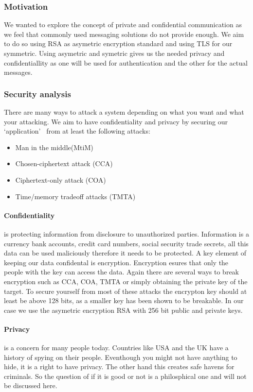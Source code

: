 
\subsubsection{Motivation}
We wanted to explore the concept of private and confidential
communication as we feel that commonly used messaging solutions do not
provide enough. We aim to do so using RSA as asymetric encryption
standard and using TLS for our symmetric. Using asymetric and symetric
gives us the needed privacy and confidentiallity as one will be used
for authentication and the other for the actual messages.


\subsubsection{Security analysis}
There are many ways to attack a system depending on what you want and
what your attacking. We aim to have confidentiality and privacy by
securing our `application'~ from at least the
following attacks:
\begin{itemize}
\item Man in the middle(MtiM)
\item Chosen-ciphertext attack (CCA)
\item Ciphertext-only attack (COA)
\item Time/memory tradeoff attacks (TMTA)
\end{itemize}

\paragraph{Confidentiality} is protecting information from disclosure
to unauthorized parties. Information is a currency bank accounts,
credit card numbers, social security trade secrets, all this data can
be used maliciously therefore it needs to be protected. A key element
of keeping our data confidental is encryption. Encryption esures that
only the people with the key can access the data. Again there are
several ways to break encryption such as CCA, COA, TMTA or simply
obtaining the private key of the target. To secure yourself from most
of these attacks the encrypton key should at least be above 128 bits,
as a smaller key has been shown to be breakable. In our case we use
the asymetric encryption RSA with 256 bit public and private keys.

\paragraph{Privacy} is a concern for many people today. Countries like
USA and the UK have a history of spying on their people. Eventhough
you might not have anything to hide, it is a right to have
privacy. The other hand this creates safe havens for criminals. So the
question of if it is good or not is a philosphical one and will not be
discussed here.

